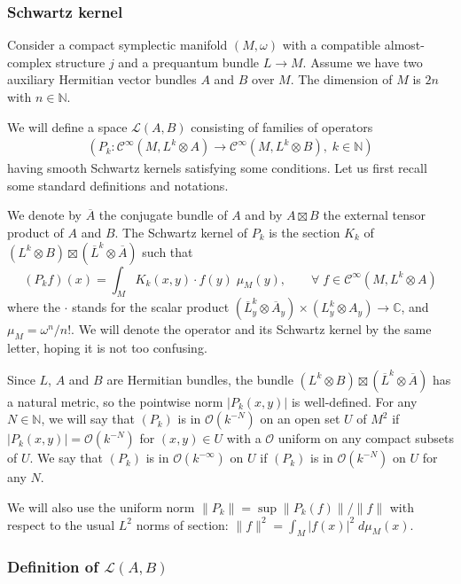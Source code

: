 \documentclass[10pt,a4paper]{article}
\theoremstyle{definition}
\numberwithin{equation}{section}
\newcommand{\N}{{\mathbb{N}}}
\newcommand{\C}{{\mathbb{C}}}
\newcommand{\om}{{\omega}}
\newcommand{\con}{\overline}
\newcommand{\Ci}{{\mathcal{C}}^{\infty}}
\newcommand{\bigo}{\mathcal{O}}
\newcommand{\lag}{\mathcal{L}}
\let\oldforall\forall
\renewcommand*{\forall}{\mathrel{\oldforall}}
\begin{document}
\subsubsection{Schwartz kernel}

Consider a compact symplectic manifold $(M, \om)$ with a compatible almost-complex structure $j$ and a prequantum bundle $L \rightarrow M$. Assume we have two auxiliary Hermitian vector bundles $A$ and $B$ over $M$. The dimension of $M$ is $2n$ with $n \in \N$.


We will define a space $\lag (A, B)$ consisting of families of operators
\begin{gather}\label{eq:P_k_family}
\left(P_k : \Ci \left(M, L^k \otimes A\right) \rightarrow \Ci \left(M, L^k
\otimes B\right), \; k \in \N \right)
\end{gather}
having smooth Schwartz kernels satisfying some conditions. Let us first recall some standard definitions and notations.

 We denote by $\con{A}$ the conjugate bundle of $A$ and by $A \boxtimes B$ the external tensor product of $A$ and $B$.  The Schwartz kernel of $P_k$ is the section $K_k$ of $(L^k \otimes B) \boxtimes (\con{L}^k \otimes \con{A})$ such that
\[
(P_k f)(x) = \int_M K_k (x,y)\cdot f(y) \; \mu_M (y), \qquad \forall \;
f \in \Ci \left(M, L^k \otimes A\right)
\]
where the $\cdot$ stands for the scalar product $(\con{L}_y^k \otimes
\con{A}_y) \times (L_y^k \otimes A_y) \rightarrow \C$, and $\mu_M =
\om^n/n!$. We will denote the operator and its Schwartz kernel by the same letter, hoping it is not too confusing.

Since $L$, $A$ and $B$ are Hermitian bundles, the bundle $(L^k \otimes B) \boxtimes (\con{L}^k
\otimes \con{A})$ has a natural metric, so the pointwise norm $|P_k (x,y)|$ is well-defined. For any $N \in \N$, we will say that $(P_k)$ is in $\bigo (k^{-N})$ on an open set $U$ of $M^2$ if $|P_k (x,y)| =
\bigo (k^{-N})$ for $(x,y) \in U$ with a $\bigo$ uniform on any compact subsets of $U$. We say that $(P_k)$ is in $\bigo (k^{-\infty})$ on $U$ if $(P_k)$ is in $\bigo (k^{-N})$ on $U$ for any $N$.

We will also use the uniform norm $\| P_k \| = \sup \|P_k (f) \| / \| f\|$ with respect to the usual $L^2$ norms of section: $\|f\|^2 = \int_M |f(x)|^2
\; d\mu_M (x)$.


\subsubsection{Definition of $\lag (A,B)$}
\end{document}

